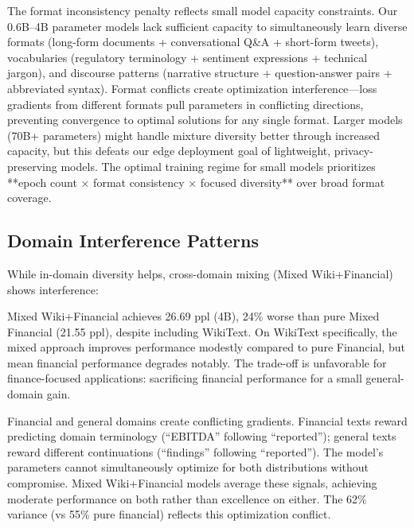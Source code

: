 The format inconsistency penalty reflects small model capacity constraints. Our 0.6B–4B parameter models lack sufficient capacity to simultaneously learn diverse formats (long-form documents + conversational Q\&A + short-form tweets), vocabularies (regulatory terminology + sentiment expressions + technical jargon), and discourse patterns (narrative structure + question-answer pairs + abbreviated syntax). Format conflicts create optimization interference—loss gradients from different formats pull parameters in conflicting directions, preventing convergence to optimal solutions for any single format. Larger models (70B+ parameters) might handle mixture diversity better through increased capacity, but this defeats our edge deployment goal of lightweight, privacy-preserving models. The optimal training regime for small models prioritizes **epoch count × format consistency × focused diversity** over broad format coverage.

\subsection{Domain Interference Patterns}

While in-domain diversity helps, cross-domain mixing (Mixed Wiki+Financial) shows interference:

Mixed Wiki+Financial achieves 26.69 ppl (4B), 24\% worse than pure Mixed Financial (21.55 ppl), despite including WikiText. On WikiText specifically, the mixed approach improves performance modestly compared to pure Financial, but mean financial performance degrades notably. The trade-off is unfavorable for finance-focused applications: sacrificing financial performance for a small general-domain gain.

Financial and general domains create conflicting gradients. Financial texts reward predicting domain terminology (``EBITDA'' following ``reported''); general texts reward different continuations (``findings'' following ``reported''). The model's parameters cannot simultaneously optimize for both distributions without compromise. Mixed Wiki+Financial models average these signals, achieving moderate performance on both rather than excellence on either. The 62\% variance (vs 55\% pure financial) reflects this optimization conflict.

